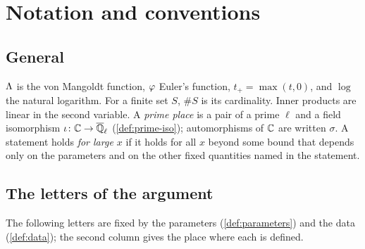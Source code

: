 \section{Notation and conventions}\label{sec:notation}

\subsection{General}\label{ss:notation-general}
$\Lambda$ is the von Mangoldt function, $\varphi$ Euler's function, $t_+=\max(t,0)$, and $\log$ the
natural logarithm. For a finite set $S$, $\#S$ is its cardinality. Inner products are linear in the
second variable. A \emph{prime place} is a pair of a prime $\ell$ and a field isomorphism
$\iota\colon\mathbb{C}\to\overline{\mathbb{Q}}_\ell$ (\cref{def:prime-iso}); automorphisms of $\mathbb{C}$ are written $\sigma$. A
statement holds \emph{for large $x$} if it holds for all $x$ beyond some bound that depends only on the
parameters and on the other fixed quantities named in the statement.

\subsection{The letters of the argument}\label{ss:notation-letters}
The following letters are fixed by the parameters (\cref{def:parameters}) and the data
(\cref{def:data}); the second column gives the place where each is defined.

